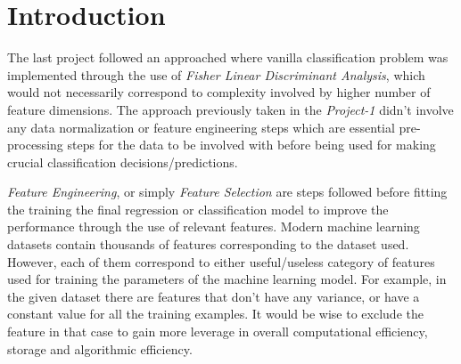 \documentclass[12pt,twoside,a4paper]{article}
\title{\mytitle}
\author{\myauthors}
\date{\mydate}
\begin{document}
\maketitle

\begin{abstract}

This project primarily deals with feature subset selection for the classification problem through the use of the Taiji sequence dataset. The use of feature selection is to solve the issues of 'Curse of Dimensionality', computational efficiency, easier data collection, storage size, and interpretability through the strategy of dimensionality reduction. Implementations of the feature selection algorithms in this project include \textbf{Filtering} and \textbf{Wrapper} methods. 

\end{abstract}
\vspace{1ex}

\tableofcontents


\section{Introduction}
The last project followed an approached where vanilla classification problem was implemented through the use of \textit{Fisher Linear Discriminant Analysis}, which would not necessarily correspond to complexity involved by higher number of feature dimensions. The approach previously taken in the \textit{Project-1} didn't involve any data normalization or feature engineering steps which are essential pre-processing steps for the data to be involved with before being used for making crucial classification decisions/predictions.

\textit{Feature Engineering}, or simply \textit{Feature Selection} are steps followed before fitting the training the final regression or classification model to improve the performance through the use of relevant features. Modern machine learning datasets contain thousands of features corresponding to the dataset used. However, each of them correspond to either useful/useless category of features used for training the parameters of the machine learning model. For example, in the given dataset there are features that don't have any variance, or have a constant value for all the training examples. It would be wise to exclude the feature in that case to gain more leverage in overall computational efficiency, storage and algorithmic efficiency.
\end{document}
